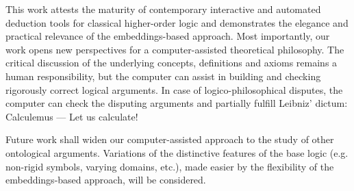 \documentclass{llncs}
\begin{document}
This work attests the maturity of contemporary interactive and
automated deduction tools for classical higher-order logic and
demonstrates the elegance and practical relevance of the embeddings-based approach.  Most importantly, our work opens new perspectives for
a computer-assisted theoretical philosophy.  The critical discussion
of the underlying concepts, definitions and axioms remains a human
responsibility, but the computer can assist in building and checking
rigorously correct logical arguments. In case of logico-philosophical
disputes, the computer can check the disputing arguments and partially
fulfill Leibniz' dictum: Calculemus --- Let us calculate!

Future work shall widen our computer-assisted approach to the
study of other ontological arguments. Variations of the distinctive features of
the base logic (e.g. non-rigid symbols, varying domains, etc.), made easier by the flexibility of the
embeddings-based approach, will
be considered.



\end{document}
